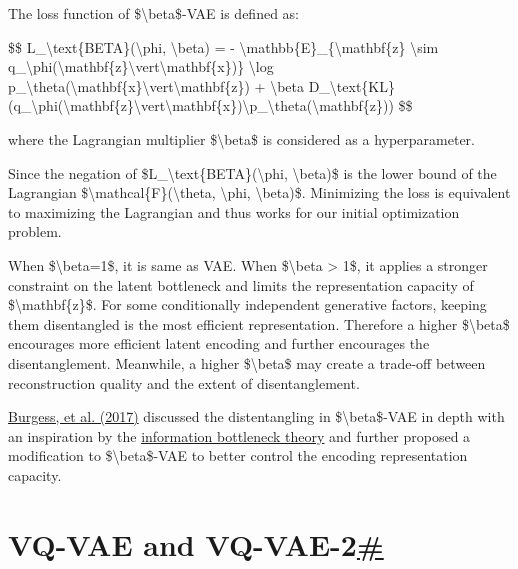 The loss function of \$\textbackslash beta\$-VAE is defined as:

\$\$ L\_\textbackslash text\{BETA\}(\textbackslash phi, \textbackslash beta) = - \textbackslash mathbb\{E\}\_\{\textbackslash mathbf\{z\} \textbackslash sim q\_\textbackslash phi(\textbackslash mathbf\{z\}\textbackslash vert\textbackslash mathbf\{x\})\} \textbackslash log p\_\textbackslash theta(\textbackslash mathbf\{x\}\textbackslash vert\textbackslash mathbf\{z\}) + \textbackslash beta D\_\textbackslash text\{KL\}(q\_\textbackslash phi(\textbackslash mathbf\{z\}\textbackslash vert\textbackslash mathbf\{x\})\textbackslash\textbar p\_\textbackslash theta(\textbackslash mathbf\{z\})) \$\$

where the Lagrangian multiplier \$\textbackslash beta\$ is considered as a hyperparameter.

Since the negation of \$L\_\textbackslash text\{BETA\}(\textbackslash phi, \textbackslash beta)\$ is the lower bound of the Lagrangian \$\textbackslash mathcal\{F\}(\textbackslash theta, \textbackslash phi, \textbackslash beta)\$. Minimizing the loss is equivalent to maximizing the Lagrangian and thus works for our initial optimization problem.

When \$\textbackslash beta=1\$, it is same as VAE. When \$\textbackslash beta \textgreater{} 1\$, it applies a stronger constraint on the latent bottleneck and limits the representation capacity of \$\textbackslash mathbf\{z\}\$. For some conditionally independent generative factors, keeping them disentangled is the most efficient representation. Therefore a higher \$\textbackslash beta\$ encourages more efficient latent encoding and further encourages the disentanglement. Meanwhile, a higher \$\textbackslash beta\$ may create a trade-off between reconstruction quality and the extent of disentanglement.

\href{https://arxiv.org/pdf/1804.03599.pdf}{Burgess, et al. (2017)} discussed the distentangling in \$\textbackslash beta\$-VAE in depth with an inspiration by the \href{https://lilianweng.github.io/posts/2017-09-28-information-bottleneck/}{information bottleneck theory} and further proposed a modification to \$\textbackslash beta\$-VAE to better control the encoding representation capacity.

\section{\texorpdfstring{VQ-VAE and VQ-VAE-2\hyperref[vq-vae-and-vq-vae-2]{\#}}{VQ-VAE and VQ-VAE-2\#}}\label{vq-vae-and-vq-vae-2}

